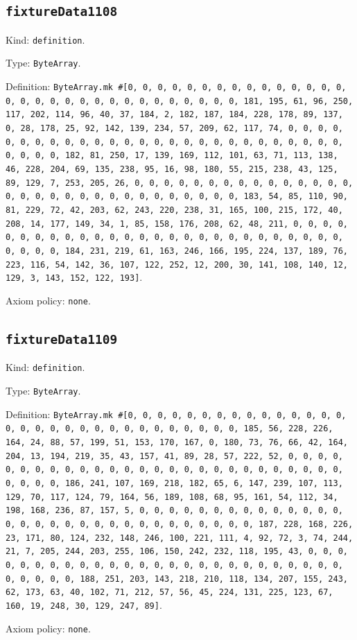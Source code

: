 \documentclass[11pt]{article}
\begin{document}
\subsection*{\texttt{fixtureData1108}}
\noindent Kind: \texttt{definition}.\par
\noindent Type: \texttt{ByteArray}.\par
\noindent Definition: \texttt{ByteArray.mk \#[0, 0, 0, 0, 0, 0, 0, 0, 0, 0, 0, 0, 0, 0, 0, 0, 0, 0, 0, 0, 0, 0, 0, 0, 0, 0, 0, 0, 0, 0, 0, 181, 195, 61, 96, 250, 117, 202, 114, 96, 40, 37, 184, 2, 182, 187, 184, 228, 178, 89, 137, 0, 28, 178, 25, 92, 142, 139, 234, 57, 209, 62, 117, 74, 0, 0, 0, 0, 0, 0, 0, 0, 0, 0, 0, 0, 0, 0, 0, 0, 0, 0, 0, 0, 0, 0, 0, 0, 0, 0, 0, 0, 0, 0, 0, 182, 81, 250, 17, 139, 169, 112, 101, 63, 71, 113, 138, 46, 228, 204, 69, 135, 238, 95, 16, 98, 180, 55, 215, 238, 43, 125, 89, 129, 7, 253, 205, 26, 0, 0, 0, 0, 0, 0, 0, 0, 0, 0, 0, 0, 0, 0, 0, 0, 0, 0, 0, 0, 0, 0, 0, 0, 0, 0, 0, 0, 0, 0, 0, 183, 54, 85, 110, 90, 81, 229, 72, 42, 203, 62, 243, 220, 238, 31, 165, 100, 215, 172, 40, 208, 14, 177, 149, 34, 1, 85, 158, 176, 208, 62, 48, 211, 0, 0, 0, 0, 0, 0, 0, 0, 0, 0, 0, 0, 0, 0, 0, 0, 0, 0, 0, 0, 0, 0, 0, 0, 0, 0, 0, 0, 0, 0, 0, 184, 231, 219, 61, 163, 246, 166, 195, 224, 137, 189, 76, 223, 116, 54, 142, 36, 107, 122, 252, 12, 200, 30, 141, 108, 140, 12, 129, 3, 143, 152, 122, 193]}.\par
\noindent Axiom policy: \texttt{none}.\par
\subsection*{\texttt{fixtureData1109}}
\noindent Kind: \texttt{definition}.\par
\noindent Type: \texttt{ByteArray}.\par
\noindent Definition: \texttt{ByteArray.mk \#[0, 0, 0, 0, 0, 0, 0, 0, 0, 0, 0, 0, 0, 0, 0, 0, 0, 0, 0, 0, 0, 0, 0, 0, 0, 0, 0, 0, 0, 0, 0, 185, 56, 228, 226, 164, 24, 88, 57, 199, 51, 153, 170, 167, 0, 180, 73, 76, 66, 42, 164, 204, 13, 194, 219, 35, 43, 157, 41, 89, 28, 57, 222, 52, 0, 0, 0, 0, 0, 0, 0, 0, 0, 0, 0, 0, 0, 0, 0, 0, 0, 0, 0, 0, 0, 0, 0, 0, 0, 0, 0, 0, 0, 0, 0, 186, 241, 107, 169, 218, 182, 65, 6, 147, 239, 107, 113, 129, 70, 117, 124, 79, 164, 56, 189, 108, 68, 95, 161, 54, 112, 34, 198, 168, 236, 87, 157, 5, 0, 0, 0, 0, 0, 0, 0, 0, 0, 0, 0, 0, 0, 0, 0, 0, 0, 0, 0, 0, 0, 0, 0, 0, 0, 0, 0, 0, 0, 0, 0, 187, 228, 168, 226, 23, 171, 80, 124, 232, 148, 246, 100, 221, 111, 4, 92, 72, 3, 74, 244, 21, 7, 205, 244, 203, 255, 106, 150, 242, 232, 118, 195, 43, 0, 0, 0, 0, 0, 0, 0, 0, 0, 0, 0, 0, 0, 0, 0, 0, 0, 0, 0, 0, 0, 0, 0, 0, 0, 0, 0, 0, 0, 0, 0, 188, 251, 203, 143, 218, 210, 118, 134, 207, 155, 243, 62, 173, 63, 40, 102, 71, 212, 57, 56, 45, 224, 131, 225, 123, 67, 160, 19, 248, 30, 129, 247, 89]}.\par
\noindent Axiom policy: \texttt{none}.\par
\end{document}
